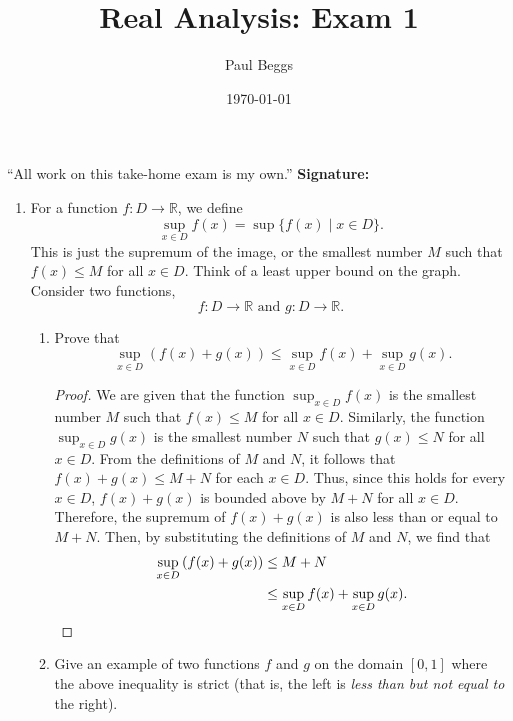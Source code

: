 \documentclass[12pt]{article}
\title{Real Analysis: Exam 1}
\author{Paul Beggs}
\date{\today}
\newcommand{\R}{\ensuremath{\mathbb{R}}}
\begin{document}
\maketitle

``All work on this take-home exam is my own.'' \hfill \textbf{Signature:} \underline{\hspace{5cm}}

\vspace{0.5cm}
\begin{enumerate}
    \item For a function \(f \colon D \rightarrow \R\), we define \[\displaystyle \sup_{x \in D} f(x) = \sup\{f(x) \mid x \in D\}.\] This is just the supremum of the image, or the smallest number \(M\) such that \(f(x) \leq M\) for all \(x \in D\). Think of a least upper bound on the graph. \\

          Consider two functions,
          \[f \colon D \rightarrow \R \text{ and } g \colon D \rightarrow \R.\]
          \begin{enumerate}
              \item Prove that \[\displaystyle \sup_{x \in D} (f(x) + g(x)) \leq \sup_{x \in D} f(x) + \sup_{x \in D} g(x).\]
                    \begin{proof}
                        We are given that the function \(\displaystyle \sup_{x \in D} f(x)\) is the smallest number \(M\) such that \(f(x) \leq M\) for all \(x \in D\). Similarly, the function \(\displaystyle \sup_{x \in D} g(x)\) is the smallest number \(N\) such that \(g(x) \leq N\) for all \(x \in D\). From the definitions of \(M\) and \(N\), it follows that \(f(x) + g(x) \leq M + N\) for each \(x \in D\). Thus, since this holds for every \(x \in D\), \(f(x) + g(x)\) is bounded above by \(M + N\) for all \(x \in D\). Therefore, the supremum of \(f(x) + g(x)\) is also less than or equal to \(M + N\). Then, by substituting the definitions of \(M\) and \(N\), we find that
                        \begin{align*}
                            \displaystyle \sup_{x \in D} \left(f(x) + g(x)\right) & \leq M + N                                               \\
                                                                                  & \leq \sup_{x \in D} f(x) + \sup_{x \in D} g(x). \qedhere
                        \end{align*}
                    \end{proof}
              \item Give an example of two functions \(f\) and \(g\) on the domain \([0,1]\) where the above inequality is strict (that is, the left is \textit{less than but not equal to} the right). \\


\end{enumerate}
\end{enumerate}
\end{document}
